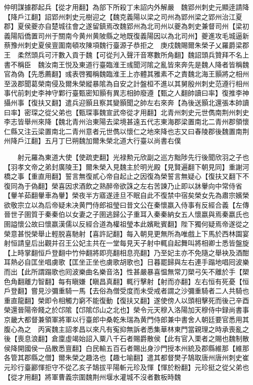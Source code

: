 仲明謀據郡起兵【從才用翻】為部下所殺丁未詔内外解嚴　魏郢州刺史元顯逹請降【降戶江翻】詔郢州刺史元樹迎之【魏克義陽以梁之司州為郢州梁之郢州治江夏郡】夏侯夔亦自楚城往會之遂留鎮焉改魏郢州為北司州以夔為刺史兼督司州【梁初義陽䧟僑置司州于關南今黄州黄陂縣之地既復義陽因以為北司州】夔進攻毛城逼新蔡豫州刺史夏侯亶圍南頓攻陳項魏行臺源子恭拒之　庚戍魏賜爾朱榮子乂羅爵梁郡王　柔然頭兵可汗數入貢于魏【可從刋入聲汗音寒數所角翻】魏詔頭兵贊拜不名上書不稱臣　魏汝南王悦及東道行臺臨淮王彧聞河隂之亂皆來奔先是魏人降者皆稱魏官為偽【先悉薦翻】彧表啓獨稱魏臨淮王上亦體其雅素不之責魏北海王顥將之相州至汲郡聞葛榮南侵及爾朱榮縱暴隂為自安之計盤桓不進以其舅殷州刺史范遵行相州事代前刺史李神守鄴行臺甄密知顥有異志相帥廢遵【甄之人翻帥讀曰率】復推李神攝州事【復扶又翻】遣兵迎顥且察其變顥聞之帥左右來奔【為後送顥北還張本帥讀曰率】密琛之從父弟也【甄琛事魏宣武帝從才用翻】北青州刺史元世儁南荆州刺史李志皆舉州來降【魏北青州治東陽去梁境甚遠五代志東海郡梁置南北二青州郡領懷仁縣又注云梁置南北二青州意者元世儁以懷仁之地來降也志又曰春陵郡後魏置南荆州降戶江翻】五月丁巳朔魏加爾朱榮北道大行臺以尚書右僕

　　射元羅為東道大使【使疏吏翻】光禄勲元欣副之巡方黜陟先行後聞欣羽之子也【羽孝文帝之弟封廣陵王】爾朱榮入見魏主於明光殿【見賢遍翻下朝見同】重謝河橋之事【重直用翻】誓言無復貳心帝自起止之因復為榮誓言無疑心【復扶又翻下不復同為于偽翻】榮喜因求酒飲之熟醉帝欲誅之左右苦諫乃止即以牀轝向中常侍省【轝羊茹翻轝車為轝】榮夜半方寤遂逹旦不眠自此不復禁中宿矣榮女先為肅宗嬪榮欲敬宗立以為后帝疑未决黄門侍郎祖瑩曰昔文公在秦懷嬴入侍事有反經合義【左傳晉世子圉質于秦秦伯以女妻之子圉逃歸公子重耳入秦秦納女五人懷嬴與焉秦嬴氏也圉謚懷公故曰懷嬴漢儒以反經合道為權祖瑩本此嬪毗賓翻】陛下獨何疑焉帝遂從之榮意甚悦榮舉止輕脱喜馳射【喜許記翻】每入朝見更無所為唯戲上下馬於西林園宴射恒請皇后出觀并召王公妃主共在一堂每見天子射中輒自起舞叫將相卿士悉皆盤旋【上時掌翻恒戶登翻中竹仲翻將即亮翻相息亮翻】乃至妃主亦不免隨之舉袂及酒酣耳熱必自匡坐唱虜歌【匡坐正坐也虜歌胡歌也】日暮罷歸與左右連手蹋地唱囘波樂而出【此所謂蹋歌也囘波樂曲名樂音洛】性甚嚴暴喜愠無常刀槊弓矢不離於手【槊色角翻離力智翻】每有瞋嫌【瞋昌真翻】輒行擊射【射而亦翻】左右恒有死憂【恒戶登翻】嘗見沙彌重騎一馬【去俗為僧受度而未受戒者謂之沙彌重騎者二人共騎也重直龍翻】榮即令相觸力窮不能復動【復扶又翻】遂使傍人以頭相擊死而後己辛酉榮還晉陽帝餞之於邙隂【邙隂邙山之北也】榮令元天穆入洛陽加天穆侍中録尚書事京畿大都督兼領軍將軍以行臺郎中桑乾朱瑞為黄門侍郎兼中書舍人朝廷要官悉用其腹心為之　丙寅魏主詔孝昌以來凡有寃抑無訴者悉集華林東門當親理之時承喪亂之後【喪息浪翻】倉廩虛竭始詔入粟八千石者賜爵散侯【此有官入栗者之賜也魏制散侯降開國侯一品散悉亶翻】白民輸五百石者賜出身沙門授本州統及郡縣維那【維那各管其郡縣之僧】爾朱榮之趣洛也【趣七喻翻】遣其都督樊子鵠取唐州唐州刺史崔元珍行臺酈惲拒守不從乙亥子鵠拔平陽斬元珍及惲【惲於粉翻】元珍挺之從父弟也【從才用翻】將軍曹義宗圍魏荆州堰水灌城不沒者數板時魏

